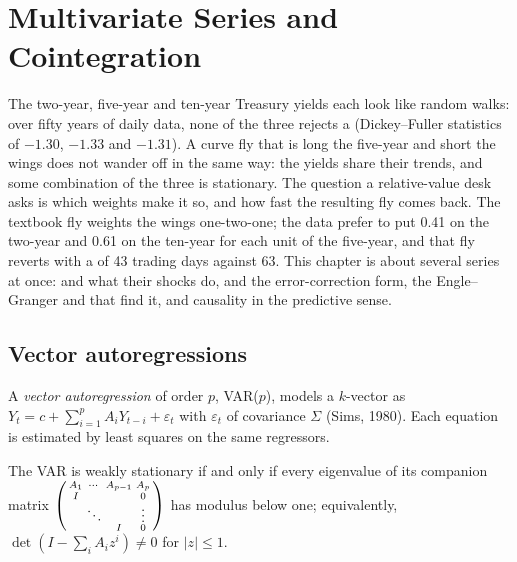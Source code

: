 \chapter{Multivariate Series and Cointegration}\label{ch:qm:multivariate-series-and-cointegration}

The two-year, five-year and ten-year Treasury yields each look like random walks: over fifty years of daily data, none of the three rejects
a  (Dickey--Fuller statistics of $-1.30$, $-1.33$ and $-1.31$). A curve fly that is long the five-year and short the wings does not
wander off in the same way: the yields share their trends, and some combination of the three is stationary. The question a relative-value
desk asks is which weights make it so, and how fast the resulting fly comes back. The textbook fly weights the wings one-two-one; the data prefer
to put 0.41 on the two-year and 0.61 on the ten-year for each unit of the five-year, and that fly reverts with a  of 43 trading days
against 63. This chapter is about several series at once:  and what their shocks do,  and the error-correction
form, the Engle--Granger and  that find it, and causality in the predictive sense.

\section{Vector autoregressions}

\begin{definition}\label{def:qm:multivariate-series-and-cointegration:var}
A \emph{vector autoregression} of order $p$, VAR($p$), models a $k$-vector as $Y_t = c + \sum_{i=1}^pA_iY_{t-i} + \varepsilon_t$ with
$\varepsilon_t$  of covariance $\Sigma$ (Sims, 1980). Each equation is estimated by least squares on the same regressors.
\end{definition}

\begin{proposition}\label{prop:qm:multivariate-series-and-cointegration:stable}
The VAR is weakly stationary if and only if every eigenvalue of its companion matrix $\begin{psmallmatrix}A_1 & \cdots & A_{p-1} & A_p\\ I & & & 0\\ & \ddots & & \vdots\\
& & I & 0\end{psmallmatrix}$ has modulus below one; equivalently, $\det(I - \sum_iA_iz^i) \ne 0$ for $|z| \le 1$.
\end{proposition}

